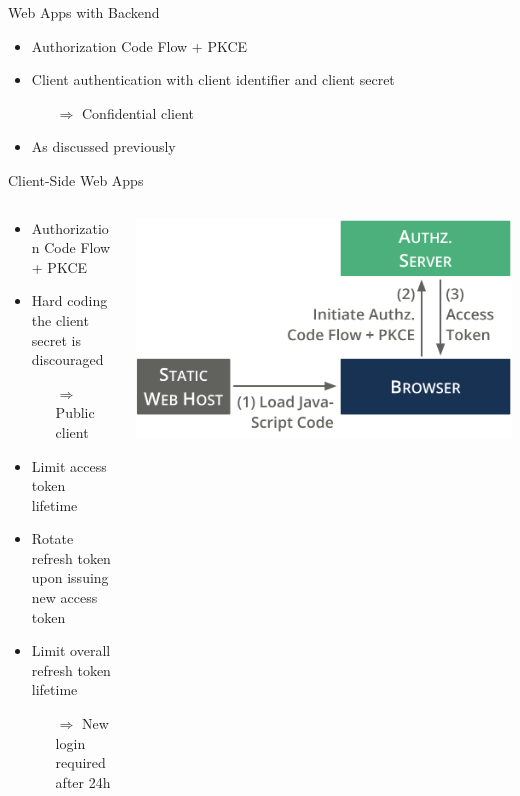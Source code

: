 \documentclass[aspectratio=169]{beamer}
\begin{document}
\begin{frame}{Web Apps with Backend \hfill {\large{}}}
	\begin{itemize}
		\item Authorization Code Flow + PKCE
		\item Client authentication with client identifier and client secret
		\begin{itemize}
			\item[$\Rightarrow$] Confidential client
		\end{itemize}
		\item As discussed previously
	\end{itemize}
\end{frame}

\begin{frame}{Client-Side Web Apps \hfill {\large{}}}
	\begin{columns}
		\begin{column}{0.56\textwidth}
			\begin{itemize}
				\item Authorization Code Flow + PKCE
				\item Hard coding the client secret is \\ discouraged 
				\begin{itemize}
					\item[$\Rightarrow$] Public client
				\end{itemize}
				\item Limit access token lifetime 
				\item Rotate refresh token upon issuing \\ new access token
				\item Limit overall refresh token \\ lifetime 
				\begin{itemize}
					\item[$\Rightarrow$] New login required after 24h
				\end{itemize}
			\end{itemize}
		\end{column}
		\begin{column}{0.45\textwidth}
			\includegraphics[width=1\textwidth]{figures/authorization-flow-cs-web-apps}

\end{column}
\end{columns}
\end{frame}
\end{document}
